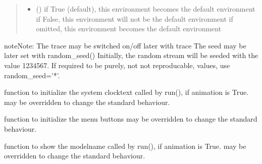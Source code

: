 \documentclass[letterpaper,10pt,english]{sphinxmanual}
\begin{document}
\begin{fulllineitems}
\begin{quote}
\begin{description}
\begin{itemize}
\item {} 
 () \textendash{} if True (default), this environment becomes the default environment 
if False, this environment will not be the default environment 
if omitted, this environment becomes the default environment 

\end{itemize}

\end{description}\end{quote}

\begin{sphinxadmonition}{note}{Note:}
The trace may be switched on/off later with trace 
The seed may be later set with random\_seed() 
Initially, the random stream will be seeded with the value 1234567.
If required to be purely, not not reproducable, values, use
random\_seed=’*’.
\end{sphinxadmonition}

\begin{fulllineitems}
\label{\detokenize{Reference:salabim.Environment.an_clocktext}}
function to initialize the system clocktext 
called by run(), if animation is True. 
may be overridden to change the standard behaviour.

\end{fulllineitems}


\begin{fulllineitems}
\label{\detokenize{Reference:salabim.Environment.an_menu_buttons}}
function to initialize the menu buttons 
may be overridden to change the standard behaviour.

\end{fulllineitems}


\begin{fulllineitems}
\label{\detokenize{Reference:salabim.Environment.an_modelname}}
function to show the modelname 
called by run(), if animation is True. 
may be overridden to change the standard behaviour.


\end{fulllineitems}
\end{fulllineitems}
\end{document}
